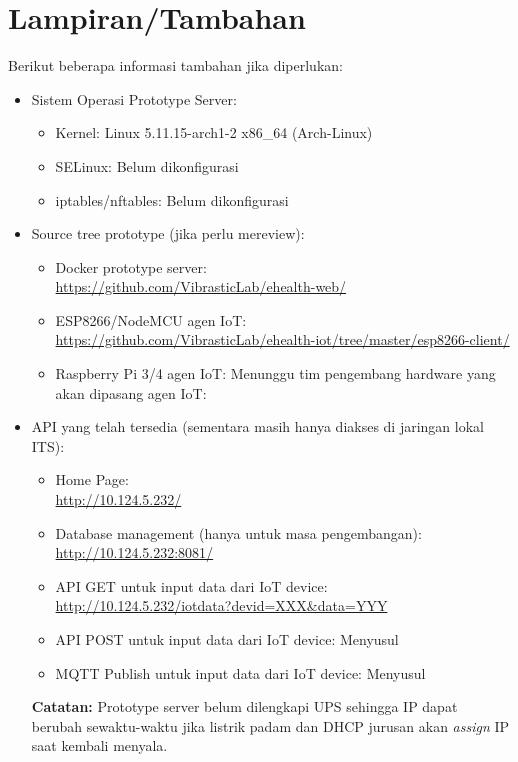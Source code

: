 \documentclass[12pt,]{article}
\begin{document}
	\newpage
	\section{Lampiran/Tambahan}
	
	Berikut beberapa informasi tambahan jika diperlukan:
	\begin{itemize}
		\item Sistem Operasi Prototype Server:
		\begin{itemize}
			\item Kernel: Linux 5.11.15-arch1-2 x86\_64 (Arch-Linux)
			\item SELinux: Belum dikonfigurasi
			\item iptables/nftables: Belum dikonfigurasi
		\end{itemize}
	
		\item Source tree prototype (jika perlu mereview):
		\begin{itemize}
			\item Docker prototype server:\\
			\url{https://github.com/VibrasticLab/ehealth-web/}
			
			\item ESP8266/NodeMCU agen IoT:\\
			\url{https://github.com/VibrasticLab/ehealth-iot/tree/master/esp8266-client/}
			
			\item Raspberry Pi 3/4 agen IoT: Menunggu tim pengembang hardware yang akan dipasang agen IoT:
		\end{itemize}
	
		\item API yang telah tersedia (sementara masih hanya diakses di jaringan lokal ITS):
		\begin{itemize}
			\item Home Page:\\
			\url{http://10.124.5.232/}
			
			\item Database management (hanya untuk masa pengembangan):\\
			\url{http://10.124.5.232:8081/}
			
			\item API GET untuk input data dari IoT device:\\
			\url{http://10.124.5.232/iotdata?devid=XXX&data=YYY}
			
			\item API POST untuk input data dari IoT device: Menyusul
			
			\item MQTT Publish untuk input data dari IoT device: Menyusul
		\end{itemize}
	
		\textbf{Catatan:} Prototype server belum dilengkapi UPS sehingga IP dapat berubah sewaktu-waktu
		jika listrik padam dan DHCP jurusan akan \textit{assign} IP saat kembali menyala.
	\end{itemize}
\end{document}
